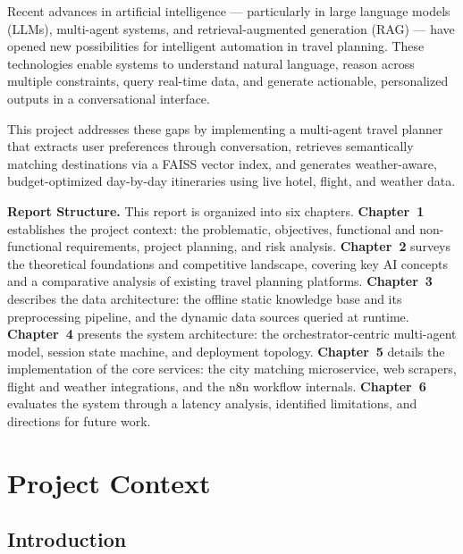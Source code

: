 \documentclass[12pt,a4paper]{report}
\begin{document}
Recent advances in artificial intelligence — particularly in large language models (LLMs), multi-agent
systems, and retrieval-augmented generation (RAG) — have opened new possibilities for intelligent
automation in travel planning. These technologies enable systems to understand natural language,
reason across multiple constraints, query real-time data, and generate actionable, personalized outputs
in a conversational interface.

This project addresses these gaps by implementing a multi-agent travel planner that extracts user preferences through conversation, retrieves semantically matching destinations via a FAISS vector index, and generates weather-aware, budget-optimized day-by-day itineraries using live hotel, flight, and weather data.

\medskip

\noindent\textbf{Report Structure.}
This report is organized into six chapters.
\textbf{Chapter~1} establishes the project context: the problematic, objectives, functional and
non-functional requirements, project planning, and risk analysis.
\textbf{Chapter~2} surveys the theoretical foundations and competitive landscape, covering key AI
concepts and a comparative analysis of existing travel planning platforms.
\textbf{Chapter~3} describes the data architecture: the offline static knowledge base and its
preprocessing pipeline, and the dynamic data sources queried at runtime.
\textbf{Chapter~4} presents the system architecture: the orchestrator-centric multi-agent model,
session state machine, and deployment topology.
\textbf{Chapter~5} details the implementation of the core services: the city matching microservice,
web scrapers, flight and weather integrations, and the n8n workflow internals.
\textbf{Chapter~6} evaluates the system through a latency analysis, identified limitations, and
directions for future work.

\medskip

\chapter{Project Context}

\section*{Introduction}
\end{document}
